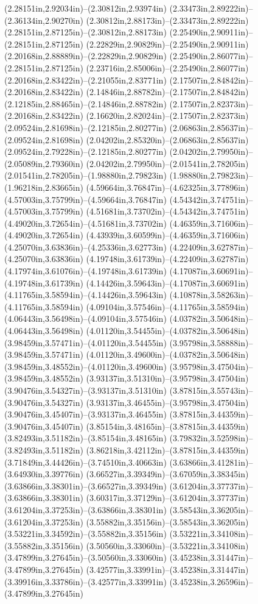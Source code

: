 (2.28151in,2.92034in)--(2.30812in,2.93974in) (2.33473in,2.89222in)--(2.36134in,2.90270in) (2.30812in,2.88173in)--(2.33473in,2.89222in) (2.28151in,2.87125in)--(2.30812in,2.88173in) (2.25490in,2.90911in)--(2.28151in,2.87125in) (2.22829in,2.90829in)--(2.25490in,2.90911in) (2.20168in,2.88889in)--(2.22829in,2.90829in) (2.25490in,2.86077in)--(2.28151in,2.87125in) (2.23716in,2.85006in)--(2.25490in,2.86077in) (2.20168in,2.83422in)--(2.21055in,2.83771in) (2.17507in,2.84842in)--(2.20168in,2.83422in) (2.14846in,2.88782in)--(2.17507in,2.84842in) (2.12185in,2.88465in)--(2.14846in,2.88782in) (2.17507in,2.82373in)--(2.20168in,2.83422in) (2.16620in,2.82024in)--(2.17507in,2.82373in) (2.09524in,2.81698in)--(2.12185in,2.80277in) (2.06863in,2.85637in)--(2.09524in,2.81698in) (2.04202in,2.85320in)--(2.06863in,2.85637in) (2.09524in,2.79228in)--(2.12185in,2.80277in) (2.04202in,2.79950in)--(2.05089in,2.79360in) (2.04202in,2.79950in)--(2.01541in,2.78205in) (2.01541in,2.78205in)--(1.98880in,2.79823in) (1.98880in,2.79823in)--(1.96218in,2.83665in) (4.59664in,3.76847in)--(4.62325in,3.77896in) (4.57003in,3.75799in)--(4.59664in,3.76847in) (4.54342in,3.74751in)--(4.57003in,3.75799in) (4.51681in,3.73702in)--(4.54342in,3.74751in) (4.49020in,3.72654in)--(4.51681in,3.73702in) (4.46359in,3.71606in)--(4.49020in,3.72654in) (4.43939in,3.60599in)--(4.46359in,3.71606in) (4.25070in,3.63836in)--(4.25336in,3.62773in) (4.22409in,3.62787in)--(4.25070in,3.63836in) (4.19748in,3.61739in)--(4.22409in,3.62787in) (4.17974in,3.61076in)--(4.19748in,3.61739in) (4.17087in,3.60691in)--(4.19748in,3.61739in) (4.14426in,3.59643in)--(4.17087in,3.60691in) (4.11765in,3.58594in)--(4.14426in,3.59643in) (4.10878in,3.58263in)--(4.11765in,3.58594in) (4.09104in,3.57546in)--(4.11765in,3.58594in) (4.06443in,3.56498in)--(4.09104in,3.57546in) (4.03782in,3.50648in)--(4.06443in,3.56498in) (4.01120in,3.54455in)--(4.03782in,3.50648in) (3.98459in,3.57471in)--(4.01120in,3.54455in) (3.95798in,3.58888in)--(3.98459in,3.57471in) (4.01120in,3.49600in)--(4.03782in,3.50648in) (3.98459in,3.48552in)--(4.01120in,3.49600in) (3.95798in,3.47504in)--(3.98459in,3.48552in) (3.93137in,3.51310in)--(3.95798in,3.47504in) (3.90476in,3.54327in)--(3.93137in,3.51310in) (3.87815in,3.55743in)--(3.90476in,3.54327in) (3.93137in,3.46455in)--(3.95798in,3.47504in) (3.90476in,3.45407in)--(3.93137in,3.46455in) (3.87815in,3.44359in)--(3.90476in,3.45407in) (3.85154in,3.48165in)--(3.87815in,3.44359in) (3.82493in,3.51182in)--(3.85154in,3.48165in) (3.79832in,3.52598in)--(3.82493in,3.51182in) (3.86218in,3.42112in)--(3.87815in,3.44359in) (3.71849in,3.44426in)--(3.74510in,3.40663in) (3.63866in,3.41281in)--(3.64930in,3.39776in) (3.66527in,3.39349in)--(3.67059in,3.38345in) (3.63866in,3.38301in)--(3.66527in,3.39349in) (3.61204in,3.37737in)--(3.63866in,3.38301in) (3.60317in,3.37129in)--(3.61204in,3.37737in) (3.61204in,3.37253in)--(3.63866in,3.38301in) (3.58543in,3.36205in)--(3.61204in,3.37253in) (3.55882in,3.35156in)--(3.58543in,3.36205in) (3.53221in,3.34592in)--(3.55882in,3.35156in) (3.53221in,3.34108in)--(3.55882in,3.35156in) (3.50560in,3.33060in)--(3.53221in,3.34108in) (3.47899in,3.27645in)--(3.50560in,3.33060in) (3.45238in,3.31447in)--(3.47899in,3.27645in) (3.42577in,3.33991in)--(3.45238in,3.31447in) (3.39916in,3.33786in)--(3.42577in,3.33991in) (3.45238in,3.26596in)--(3.47899in,3.27645in) 